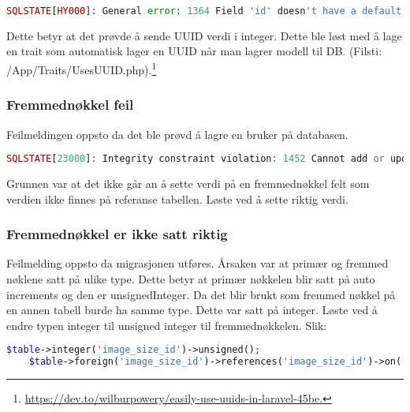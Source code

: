 \begin{lstlisting}[language=PHP]
SQLSTATE[HY000]: General error: 1364 Field 'id' doesn't have a default value (SQL: insert into `fields` (`name`, `slug`, `updated_at`, `created_at`) values (HELLO WORLD, hello_world, 2019-02-06 08:57:48, 2019-02-06 08:57:48))
\end{lstlisting}
Dette betyr at det prøvde å sende UUID verdi i integer.
Dette ble løst med å lage en trait som automatisk lager en UUID når man lagrer modell til DB. (Filsti: /App/Traits/UsesUUID.php).\footnote{\url{ https://dev.to/wilburpowery/easily-use-uuids-in-laravel-45be.}}
 
\subsubsection{Fremmednøkkel feil}
Feilmeldingen oppsto da det ble prøvd å lagre en bruker på databasen. 

\begin{lstlisting}[language=PHP]
    SQLSTATE[23000]: Integrity constraint violation: 1452 Cannot add or update a child row: a foreign key constraint fails (`sirkus-media`.`users`, CONSTRAINT `users_image_id_foreign` FOREIGN KEY (`image_id`) REFERENCES `images` (`id`)) (SQL: insert into `users` (`name`, `phone`, `email`, `password`, `image_id`, `verified`, `email_token`, `id`, `updated_at`, `created_at`) values (Bere, 4578891, berg@gmail.com, 1234567r, 2432479, 1, e-token, 53f98032-f9bf-40a6-9d70-ca9c0785d7ee, 2019-02-08 10:11:16, 2019-02-08 10:11:16))
\end{lstlisting}

Grunnen var at det ikke går an å sette verdi på en fremmednøkkel felt som verdien ikke finnes på referanse tabellen. Løste ved å sette riktig verdi.

\subsubsection{Fremmednøkkel er ikke satt riktig}
Feilmelding oppsto da migrasjonen utføres. 
Årsaken var at primær og fremmed nøklene satt på ulike type.
Dette betyr at primær nøkkelen blir satt på auto increments og den er unsignedInteger. Da det blir brukt som fremmed nøkkel på en annen tabell burde ha samme type. Dette var satt på integer.
Løste ved å endre typen integer til unsigned integer til fremmednøkkelen. Slik:

\begin{lstlisting}[language=PHP]
    $table->integer('image_size_id')->unsigned();
    $table->foreign('image_size_id')->references('image_size_id')->on('image_sizes');
\end{lstlisting}

